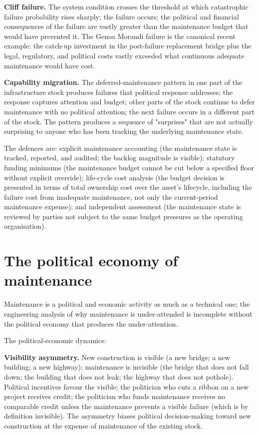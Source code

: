 \textbf{Cliff failure.} The system condition crosses the threshold at which catastrophic failure probability rises sharply; the failure occurs; the political and financial consequences of the failure are vastly greater than the maintenance budget that would have prevented it. The Genoa Morandi failure is the canonical recent example: the catch-up investment in the post-failure replacement bridge plus the legal, regulatory, and political costs vastly exceeded what continuous adequate maintenance would have cost.

\textbf{Capability migration.} The deferred-maintenance pattern in one part of the infrastructure stock produces failures that political response addresses; the response captures attention and budget; other parts of the stock continue to defer maintenance with no political attention; the next failure occurs in a different part of the stock. The pattern produces a sequence of "surprises" that are not actually surprising to anyone who has been tracking the underlying maintenance state.

The defences are: explicit maintenance accounting (the maintenance state is tracked, reported, and audited; the backlog magnitude is visible); statutory funding minimums (the maintenance budget cannot be cut below a specified floor without explicit override); life-cycle cost analysis (the budget decision is presented in terms of total ownership cost over the asset's lifecycle, including the failure cost from inadequate maintenance, not only the current-period maintenance expense); and independent assessment (the maintenance state is reviewed by parties not subject to the same budget pressures as the operating organisation).

\section{The political economy of maintenance}

Maintenance is a political and economic activity as much as a technical one; the engineering analysis of why maintenance is under-attended is incomplete without the political economy that produces the under-attention.

The political-economic dynamics:

\textbf{Visibility asymmetry.} New construction is visible (a new bridge; a new building; a new highway); maintenance is invisible (the bridge that does not fall down; the building that does not leak; the highway that does not pothole). Political incentives favour the visible; the politician who cuts a ribbon on a new project receives credit; the politician who funds maintenance receives no comparable credit unless the maintenance prevents a visible failure (which is by definition invisible). The asymmetry biases political decision-making toward new construction at the expense of maintenance of the existing stock.

